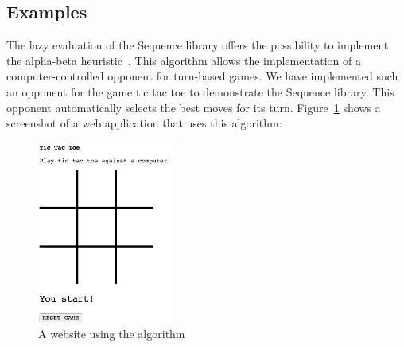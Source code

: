 \subsection*{Examples} %
\label{sub:introduction_Examples}
The lazy evaluation of the Sequence library offers the possibility to implement
the alpha-beta heuristic~\cite[Ch. 5]{hughes_why_1989}. 
This algorithm allows the implementation of a computer-controlled opponent for
turn-based games. We have implemented such an opponent for the game tic tac toe
to demonstrate the Sequence library. This opponent automatically selects the
best moves for its turn. Figure~\ref{img:intro_ttt_playfield} shows a screenshot of a web
application that uses this algorithm:
\begin{figure}[H]
    \centering
    \includegraphics[width=0.4\textwidth]{./mainmatter/pictures/tic-tac-toe-field.jpg}
    \caption{A website using the algorithm}
    \label{img:intro_ttt_playfield}
\end{figure}

